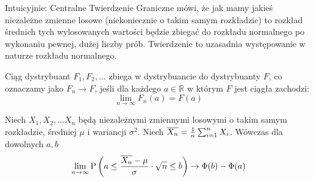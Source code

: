 Intuicyjnie: Centralne Twierdzenie Graniczne mówi, że jak mamy jakieś niezależne zmienne losowe (niekoniecznie o takim samym rozkładzie) to rozkład średnich tych wylosowanych wartości będzie zbiegać do rozkładu normalnego po wykonaniu pewnej, dużej liczby prób.
Twierdzenie to uzasadnia występowanie w naturze rozkładu normalnego.
\begin{definition}
	Ciąg dystrybuant \( F_1, F_2, ... \) zbiega w dystrybuancie do dystrybuanty \( F\), co oznaczamy jako \(F_n \to F \), jeśli dla każdego \(a \in \mathbb{R} \) w którym \( F \) jest ciągła zachodzi:
	\[
		\lim_{n \to \infty} F_n(a) = F(a)
	\]
\end{definition}

\begin{theorem}
	Niech \( X_1, X_2, ... X_n\) będą niezależnymi zmiennymi losowymi o takim samym rozkładzie, średniej \( \mu\) i wariancji \( \sigma^2\). Niech \( \overline{X_n} = \frac{1}{n}\sum_{i=1}^n X_i \). Wówczas dla dowolnych \(a, b\)
	\[
		\lim_{n \to \infty} \mathrm{P} \left( a \leq \frac{ \overline{X_n} - \mu}{\sigma} \cdot \sqrt{n} \leq b \right) \to \Phi(b) - \Phi(a)
	\]
\end{theorem}
